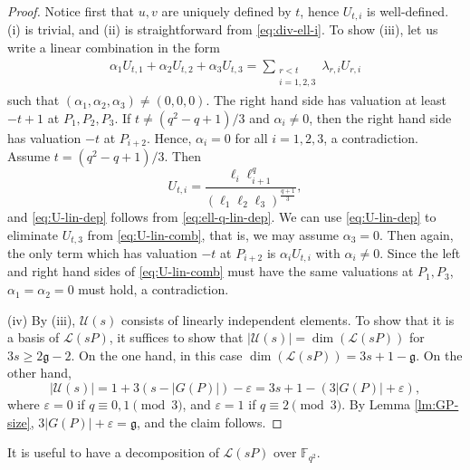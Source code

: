 \documentclass[entropy,article,submit,pdftex,moreauthors]{Definitions/mdpi}
\newcommand{\g}{\mathfrak{g}}
\begin{document}
\begin{proof}
Notice first that $u,v$ are uniquely defined by $t$, hence $U_{t,i}$ is well-defined. (i) is trivial, and (ii) is straightforward from \eqref{eq:div-ell-i}. To show (iii), let us write a linear combination in the form
\begin{align} \label{eq:U-lin-comb}
\alpha_1 U_{t,1}+\alpha_2 U_{t,2} + \alpha_3 U_{t,3} = \sum\limits_{\substack{r<t \\ i=1,2,3}} \lambda_{r,i} U_{r,i}
\end{align}
such that $(\alpha_1,\alpha_2,\alpha_3)\neq (0,0,0)$. The right hand side has valuation at least $-t+1$ at $P_1,P_2,P_3$. If $t\neq (q^2-q+1)/3$ and $\alpha_i\neq 0$, then the right hand side has valuation $-t$ at $P_{i+2}$. Hence, $\alpha_i=0$ for all $i=1,2,3$, a contradiction. Assume $t=(q^2-q+1)/3$. Then
\[U_{t,i}=\frac{\ell_i\ell_{i+1}^q}{(\ell_1\ell_2\ell_3)^\frac{q+1}{3}},\]
and \eqref{eq:U-lin-dep} follows from \eqref{eq:ell-q-lin-dep}. We can use \eqref{eq:U-lin-dep} to eliminate $U_{t,3}$ from \eqref{eq:U-lin-comb}, that is, we may assume $\alpha_3=0$. Then again, the only term which has valuation $-t$ at $P_{i+2}$ is $\alpha_iU_{t,i}$ with $\alpha_i\neq 0$. Since the left and right hand sides of \eqref{eq:U-lin-comb} must have the same valuations at $P_1,P_3$, $\alpha_1=\alpha_2=0$ must hold, a contradiction. 

(iv) By (iii), $\mathcal{U}(s)$ consists of linearly independent elements. To show that it is a basis of $\mathscr{L}(sP)$, it suffices to show that $|\mathcal{U}(s)|=\dim(\mathscr{L}(sP))$ for $3s\geq 2\g-2$. On the one hand, in this case $\dim(\mathscr{L}(sP)) = 3s+1-\g$. On the other hand, 
\[|\mathcal{U}(s)|=1+3(s-|G(P)|)-\varepsilon = 3s+1-(3|G(P)|+\varepsilon),\]
where $\varepsilon=0$ if $q\equiv0,1\pmod3$, and $\varepsilon=1$ if $q\equiv 2\pmod3$. By Lemma \ref{lm:GP-size}, $3|G(P)|+\varepsilon = \g$, and the claim follows. 
\end{proof}

It is useful to have a decomposition of $\mathscr{L}(sP)$ over $\mathbb{F}_{q^2}$.
\end{document}
